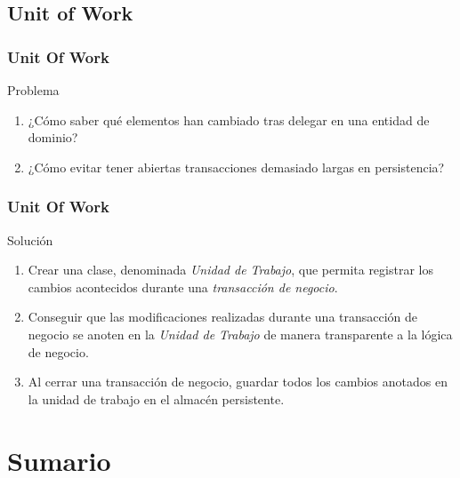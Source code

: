 \documentclass[handout,a4paper,slidestop,xcolor=pst,blue]{beamer}
\begin{document}
\subsection{Unit of Work}

\begin{frame}[c]
    \frametitle{Unit Of Work}
    \begin{block}{Problema}
        \begin{enumerate}
            \item<1-> ¿Cómo saber qué elementos han cambiado tras delegar en una entidad de dominio?
            \item<2-> ¿Cómo evitar tener abiertas transacciones demasiado largas en persistencia?
        \end{enumerate}
    \end{block}
\end{frame}

\begin{frame}[c]
    \frametitle{Unit Of Work}
    \begin{block}{Solución}
        \begin{enumerate}
            \item<1-> Crear una clase, denominada \emph{Unidad de Trabajo}, que permita registrar los cambios acontecidos durante una \emph{transacción de negocio}.
            \item<2-> Conseguir que las modificaciones realizadas durante una transacción de negocio se anoten en la \emph{Unidad de Trabajo} de manera transparente a la lógica de negocio.
            \item<3-> Al cerrar una transacción de negocio, guardar todos los cambios anotados en la unidad de trabajo en el almacén persistente.
        \end{enumerate}
    \end{block}
\end{frame}

\section{Sumario}
\end{document}
